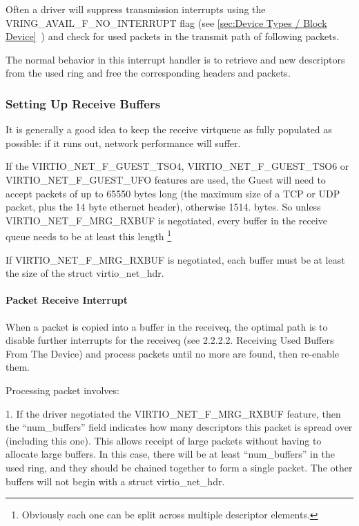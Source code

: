 Often a driver will suppress transmission interrupts using the
VRING_AVAIL_F_NO_INTERRUPT flag
 (see \ref{sec:Device Types / Block Device}~)
and check for used packets in the transmit path of following
packets.

The normal behavior in this interrupt handler is to retrieve and
new descriptors from the used ring and free the corresponding
headers and packets.

\subsubsection{Setting Up Receive Buffers}\label{sec:Device Types / Network Device / Device Operation / Setting Up Receive Buffers}

It is generally a good idea to keep the receive virtqueue as
fully populated as possible: if it runs out, network performance
will suffer.

If the VIRTIO_NET_F_GUEST_TSO4, VIRTIO_NET_F_GUEST_TSO6 or
VIRTIO_NET_F_GUEST_UFO features are used, the Guest will need to
accept packets of up to 65550 bytes long (the maximum size of a
TCP or UDP packet, plus the 14 byte ethernet header), otherwise
1514. bytes. So unless VIRTIO_NET_F_MRG_RXBUF is negotiated, every
buffer in the receive queue needs to be at least this length 
\footnote{Obviously each one can be split across multiple descriptor
elements.
}

If VIRTIO_NET_F_MRG_RXBUF is negotiated, each buffer must be at
least the size of the struct virtio_net_hdr.

\paragraph{Packet Receive Interrupt}\label{sec:Device Types / Network Device / Device Operation / Setting Up Receive Buffers / Packet Receive Interrupt}

When a packet is copied into a buffer in the receiveq, the
optimal path is to disable further interrupts for the receiveq
(see 2.2.2.2. Receiving Used Buffers From The Device) and process
packets until no more are found, then re-enable them.

Processing packet involves:

1. If the driver negotiated the VIRTIO_NET_F_MRG_RXBUF feature,
  then the “num_buffers” field indicates how many descriptors
  this packet is spread over (including this one). This allows
  receipt of large packets without having to allocate large
  buffers. In this case, there will be at least “num_buffers” in
  the used ring, and they should be chained together to form a
  single packet. The other buffers will not begin with a struct
  virtio_net_hdr.

